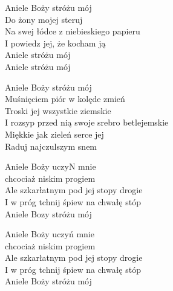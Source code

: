 \begin{text}
    Aniele Boży stróżu mój\\
    Do żony mojej steruj\\
    Na swej łódce z niebieskiego papieru\\
    I powiedz jej, że kocham ją\\
    Aniele stróżu mój\\
    Aniele stróżu mój

    Aniele Boży stróżu mój\\
    Muśnięciem piór w kolęde zmień\\
    Troski jej wszystkie ziemskie\\
    I rozsyp przed nią swoje srebro betlejemskie\\
    Miękkie jak zieleń serce jej\\
    Raduj najczulszym snem

    Aniele Boży uczyN mnie\\
    chcociaż niskim progiem\\
    Ale szkarłatnym pod jej stopy drogie\\
    I w próg tchnij śpiew na chwałę stóp\\
    Aniele Bozy stróżu mój

    Aniele Boży uczyń mnie\\
    chcociaż niskim progiem\\
    Ale szkarłatnym pod jej stopy drogie\\
    I w próg tchnij śpiew na chwałę stóp\\
    Aniele Boży stróżu mój
\end{text}
\begin{chord}

\end{chord}